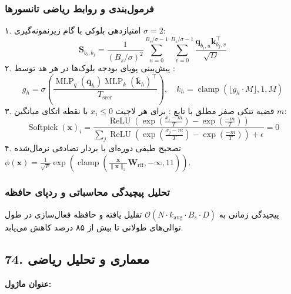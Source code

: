 \subsubsection*{فرمول‌بندی و روابط ریاضی تانسورها}
۱. امتیازدهی بلوکی با گام زیرنمونه‌گیری $\sigma = 2$:
\begin{equation}
\mathbf{S}_{b_i, b_j} = \frac{1}{(B_s / \sigma)^2} \sum_{u=0}^{B_s/\sigma - 1} \sum_{v=0}^{B_s/\sigma - 1} \frac{\mathbf{q}_{b_i, u} \mathbf{k}_{b_j, v}^\top}{\sqrt{D}}
\end{equation}
۲. پیش‌بینی پویای بودجه بلوک‌ها در هر هد توسط :
\begin{equation}
g_h = \sigma\left(\frac{\operatorname{MLP}_q(\bar{\mathbf{q}}_h) \operatorname{MLP}_k(\bar{\mathbf{k}}_h)^\top}{T_{\text{seer}}}\right), \quad k_h = \operatorname{clamp}\left(\lfloor g_h \cdot M \rfloor, 1, M\right)
\end{equation}
۳. قضیه تنکی صفر مطلق با تابع : برای هر لاجیت $x_i \le 0$ با نقطه اتکای میانگین $m$:
\begin{equation}
\operatorname{Softpick}(\mathbf{x})_i = \frac{\operatorname{ReLU}\left(\exp\left(\frac{x_i - m}{T}\right) - \exp\left(\frac{-m}{T}\right)\right)}{\sum_j \operatorname{ReLU}\left(\exp\left(\frac{x_j - m}{T}\right) - \exp\left(\frac{-m}{T}\right)\right) + \epsilon} = 0
\end{equation}
۴. تصحیح طیفی دوره‌ای با بردار تصادفی نرمال‌شده $\phi(\mathbf{x}) = \frac{1}{\sqrt{F}} \exp\left(\operatorname{clamp}\left(\frac{\mathbf{x}}{\|\mathbf{x}\|_2} \mathbf{W}_{\text{rff}}, -\infty, 11\right)\right)$.

\subsubsection*{تحلیل پیچیدگی محاسباتی و ردپای حافظه}
پیچیدگی زمانی به $\mathcal{O}(N \cdot k_{\text{avg}} \cdot B_s \cdot D)$ تقلیل یافته و حافظه فعال‌سازی در طول توالی‌های طولانی تا بیش از ۸۵ درصد کاهش می‌یابد.


\subsection*{74. معماری و تحلیل ریاضی }
\textbf{عنوان ماژول:} 

